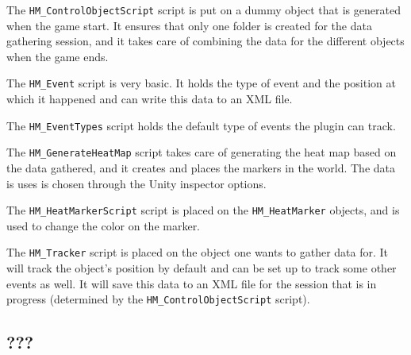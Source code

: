 \begin{my_itemize}

	\item The \texttt{HM\_ControlObjectScript} script is put on a dummy object that is generated when the game start. It ensures that only one folder is created for the data gathering session, and it takes care of combining the data for the different objects when the game ends.

	\item The \texttt{HM\_Event} script is very basic. It holds the type of event and the position at which it happened and can write this data to an XML file.

	\item The \texttt{HM\_EventTypes} script holds the default type of events the plugin can track.

	\item The \texttt{HM\_GenerateHeatMap} script takes care of generating the heat map based on the data gathered, and it creates and places the markers in the world. The data is uses is chosen through the Unity inspector options.

	\item The \texttt{HM\_HeatMarkerScript} script is placed on the \texttt{HM\_HeatMarker} objects, and is used to change the color on the marker.

	\item The \texttt{HM\_Tracker} script is placed on the object one wants to gather data for. It will track the object's position by default and can be set up to track some other events as well. It will save this data to an XML file for the session that is in progress (determined by the \texttt{HM\_ControlObjectScript} script).

\end{my_itemize}

\subsection{???}
\label{03_02}
